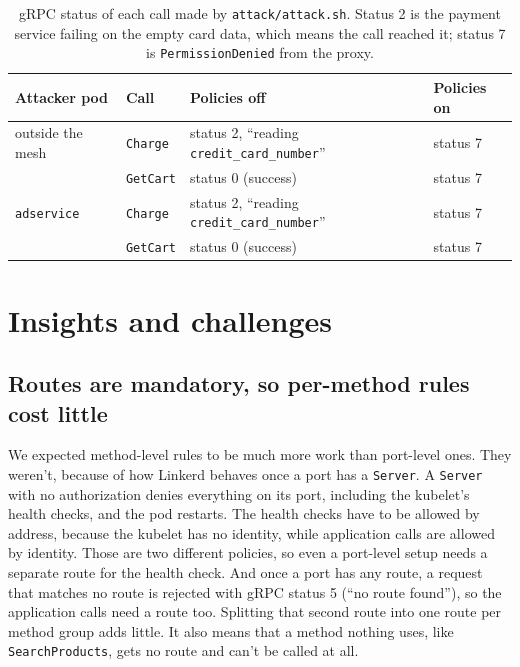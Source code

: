 \documentclass[12pt,a4paper]{article}
\begin{document}
\begin{table}[H]
  \centering
  \small
  \begin{tabular}{llll}
    \toprule
    Attacker pod & Call & Policies off & Policies on \\
    \midrule
    outside the mesh   & \texttt{Charge}  & status 2, ``reading \texttt{credit\_card\_number}'' & status 7 \\
                       & \texttt{GetCart} & status 0 (success)                               & status 7 \\
    \texttt{adservice} & \texttt{Charge}  & status 2, ``reading \texttt{credit\_card\_number}'' & status 7 \\
                       & \texttt{GetCart} & status 0 (success)                               & status 7 \\
    \bottomrule
  \end{tabular}
  \captionsetup{justification=raggedright}
  \caption{gRPC status of each call made by \texttt{attack/attack.sh}. Status 2
    is the payment service failing on the empty card data, which means the
    call reached it; status 7 is \texttt{PermissionDenied} from the proxy.}
  \label{tab:attack}
\end{table}

\section{Insights and challenges}
\label{sec:insights}

\subsection*{Routes are mandatory, so per-method rules cost little}

We expected method-level rules to be much more work than port-level ones. They
weren't, because of how Linkerd behaves once a port has a \texttt{Server}.
A \texttt{Server} with no authorization denies everything on its port,
including the kubelet's health checks, and the pod restarts. The health
checks have to be allowed by address, because the kubelet has no identity,
while application calls are allowed by identity. Those are two different
policies, so even a port-level setup needs a separate route for the health
check. And once a port has any route, a request that matches no route is
rejected with gRPC status 5 (``no route found''), so the application calls
need a route too. Splitting that second route into one route per method group
adds little. It also means that a method nothing uses, like
\texttt{SearchProducts}, gets no route and can't be called at all.
\end{document}
